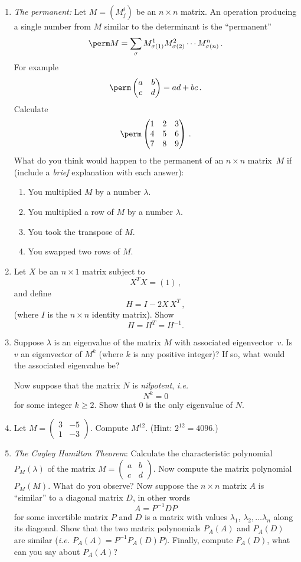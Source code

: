 \begin{enumerate}
\item
{\itshape The permanent:} Let $M=(M^i_j)$ be an $n\times n$ matrix. An operation producing a single number from $M$ similar
to the determinant is the ``permanent''
\[
\perm M =\sum_\sigma M^1_{\sigma(1)} M^2_{\sigma(2)}\cdots M^n_{\sigma(n)}\, .
\]
For example
\[
\perm \begin{pmatrix}a & b \\ c & d\end{pmatrix}=ad+bc\, .
\]
{Calculate} 
\[
\perm \begin{pmatrix}1 & 2 & 3 \\ 4 & 5 & 6 \\ 7 & 8 & 9\end{pmatrix}\, .
\]
\noindent
What do you think would happen to the permanent of an $n\times n$ matrix~$M$ if (include a {\itshape brief} explanation with each answer):
\begin{enumerate}
\item You multiplied $M$ by a number $\lambda$.
\item You multiplied a row of $M$ by a number $\lambda$.
\item You took the transpose of $M$.
\item  You swapped two rows of $M$.
\end{enumerate}


\item
Let $X$ be an $n\times 1$ matrix subject to
\[
{X}^{T} X=(1)\, ,
\]
and define
\[
H=I - 2 X \,\!X^T\, ,
\]
(where $I$ is the $n\times n$ identity matrix).
Show 
\[
H=H^{T}=H^{-1}.
\]

\item Suppose $\lambda$ is an eigenvalue of the matrix $M$ with associated eigenvector~$v$.
Is~$v$ an eigenvector of $M^k$ (where $k$ is any positive integer)? If so, what would the associated
eigenvalue be?

Now suppose that the matrix $N$ is {\itshape nilpotent}, {\itshape i.e.}
\[
N^k=0
\]
for some integer $k\geq 2$. Show that 0 is the only eigenvalue of $N$.

\item
Let $M=\begin{pmatrix}3&-5\\[2mm]1&-3\end{pmatrix}$. Compute $M^{12}$. (Hint: $2^{12}=4096$.)

\item {\itshape The Cayley Hamilton Theorem}:
Calculate the characteristic polynomial $P_M(\lambda)$ of the matrix $M=\begin{pmatrix}a & b\\c & d\end{pmatrix}$.
Now compute the matrix polynomial $P_M(M)$. What do you observe? Now suppose the $n\times n$ matrix $A$
is ``similar'' to a diagonal matrix $D$, in other words \[A=P^{-1}DP\] for some invertible matrix $P$ and $D$ is a matrix with values $\lambda_1$, $\lambda_2,\ldots \lambda_n$ along its diagonal. Show that the two matrix polynomials $P_A(A)$ and $P_A(D)$ are similar ({\itshape i.e.} $P_A(A)=P^{-1} P_A(D) P$).
Finally, compute $P_A(D)$, what can you say about $P_A(A)$?


\end{enumerate}
